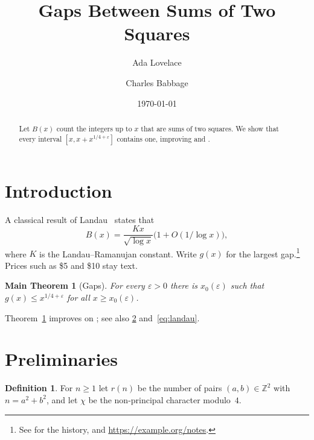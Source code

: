 \documentclass[11pt]{amsart}
\newtheorem{mainthm}{Main Theorem}
\theoremstyle{definition}
\newtheorem{definition}[theorem]{Definition}
\theoremstyle{remark}
\numberwithin{equation}{section}
\newcommand{\Z}{\mathbb{Z}}
\begin{document}
\title{Gaps Between Sums of Two Squares}

\author{Ada Lovelace}
\address{Department of Mathematics, University of London}

\author{Charles Babbage}
\address{Analytical Engine Laboratory, Cambridge}

\date{\today}

\begin{abstract}
Let $B(x)$ count the integers up to $x$ that are sums of two squares.
We show that every interval $[x, x + x^{1/4+\varepsilon}]$ contains one,
improving \cite[Thm.~2]{hooley} and \cite{landau}.
\end{abstract}

\maketitle

\section{Introduction}\label{sec:intro}

A classical result of Landau~\cite{landau} states that
\begin{equation}\label{eq:landau}
  B(x) = \frac{K x}{\sqrt{\log x}} \bigl(1 + O(1/\log x)\bigr),
\end{equation}
where $K$ is the Landau--Ramanujan constant. %
Write $g(x)$ for the largest gap.\footnote{See \cite{hooley} for the history, and
\url{https://example.org/notes}.} Prices such as \$5 and \$10 stay text.

\begin{mainthm}[Gaps]\label{thm:main}
For every $\varepsilon > 0$ there is $x_0(\varepsilon)$ such that
$g(x) \le x^{1/4+\varepsilon}$ for all $x \ge x_0(\varepsilon)$.
\end{mainthm}

Theorem~\ref{thm:main} improves on \cite{hooley,landau}; see also
\cref{sec:prelim} and~\eqref{eq:landau}.

\section{Preliminaries}
\label{sec:prelim}

\begin{definition}\label{def:r}
For $n \ge 1$ let $r(n)$ be the number of pairs $(a, b) \in \Z^2$ with
$n = a^2 + b^2$, and let $\chi$ be the non-principal character modulo~$4$.
\end{definition}
\end{document}
